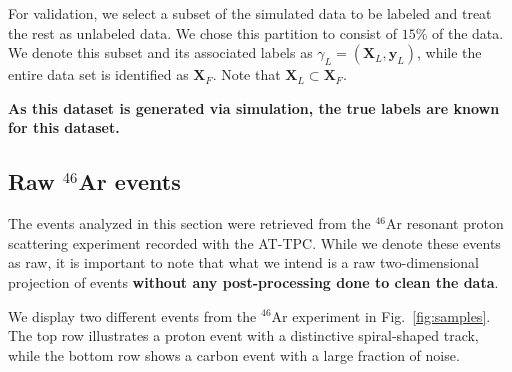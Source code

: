 \documentclass[review,sort&compress]{elsarticle}
\begin{document}
For validation, we select a subset of the simulated data to be labeled and treat the rest as unlabeled data. We chose this partition to consist of  $15\%$ of the data. We denote this subset and its associated labels as $\gamma_L=(\boldsymbol{X}_L, \boldsymbol{y}_L)$, while the entire data set is identified as $\boldsymbol{X}_F$. Note that $\boldsymbol{X}_L \subset \boldsymbol{X}_F$.

{\bf As this dataset is generated via simulation, the true labels are known for this dataset.}

\subsection{Raw \texorpdfstring{${}^{46}$Ar}{46Ar}  events}\label{sec:data_real}

The events analyzed in this section were retrieved from the ${}^{46}$Ar resonant proton scattering experiment recorded with the AT-TPC. 
While we denote these events as raw, it is important to note that what we intend is a raw two-dimensional projection of events {\bf without any post-processing done to clean the data}.


We display two different events from the ${}^{46}$Ar experiment in Fig.~\ref{fig:samples}. The top row illustrates a proton event with a distinctive spiral-shaped track, while the bottom row shows a carbon event with a large fraction of noise. 
\end{document}
